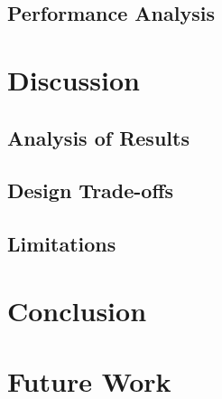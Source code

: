 \documentclass[12pt, a4paper, ukenglish]{article}
\begin{document}
    \subsection{Performance Analysis}\label{sec: per analysis}

\section{Discussion} \label{sec: discussion}
    \subsection{Analysis of Results} \label{sec: analysis}
    
    
    \subsection{Design Trade-offs} \label{sec: trade-offs}
    
    \subsection{Limitations} \label{sec: limitations}
    
\section{Conclusion} \label{sec: conclusion}

\section{Future Work} \label{sec: future work}
\end{document}
